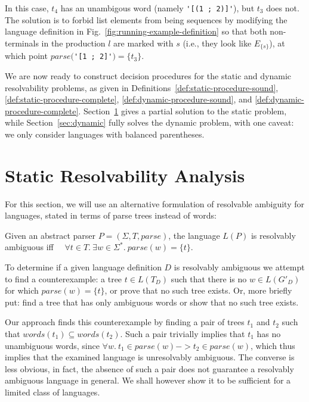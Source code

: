 \documentclass[runningheads]{llncs}
\newcommand{\T}{\Sigma} %
\newcommand{\parse}{\mathit{parse}} %
\newcommand{\words}{\mathit{words}} %
\begin{document}
\noindent In this case, $t_4$ has an unambigous word (namely \verb|'[(1 ; 2)]'|), but $t_3$ does not. The solution is to forbid list elements from being sequences by modifying the language definition in Fig.~\ref{fig:running-example-definition} so that both non-terminals in the production $l$ are marked with $s$ (i.e., they look like $E_{\{s\}}$), at which point $\parse($\verb|'[1 ; 2]'|$) = \{t_3\}$.

We are now ready to construct decision procedures for the static and dynamic resolvability problems, as given in Definitions~\ref{def:static-procedure-sound}, \ref{def:static-procedure-complete}, \ref{def:dynamic-procedure-sound}, and \ref{def:dynamic-procedure-complete}. Section~\ref{sec:static} gives a partial solution to the static problem, while Section~\ref{sec:dynamic} fully solves the dynamic problem, with one caveat: we only consider languages with balanced parentheses.

\section{Static Resolvability Analysis} \label{sec:static}

For this section, we will use an alternative formulation of resolvable ambiguity for languages, stated in terms of parse trees instead of words:

\begin{lemma}
  Given an abstract parser $P = (\T, T, \parse)$, the language $L(P)$ is resolvably ambiguous iff $\quad\forall t \in T.\ \exists w \in \T^{*}.\ \parse(w) = \{t\}$.
\end{lemma}

\noindent To determine if a given language definition $D$ is resolvably ambiguous we attempt to find a counterexample: a tree $t \in L(T_D)$ such that there is no $w \in L(G'_D)$ for which $\parse(w) = \{t\}$, or prove that no such tree exists. Or, more briefly put: find a tree that has only ambiguous words or show that no such tree exists.

Our approach finds this counterexample by finding a pair of trees $t_1$ and $t_2$ such that $\words(t_1) \subseteq \words(t_2)$. Such a pair trivially implies that $t_1$ has no unambiguous words, since $\forall w.\ t_1 \in \parse(w) -> t_2 \in \parse(w)$, which thus implies that the examined language is unresolvably ambiguous. The converse is less obvious, in fact, the absence of such a pair does not guarantee a resolvably ambiguous language in general. We shall however show it to be sufficient for a limited class of languages.
\end{document}
